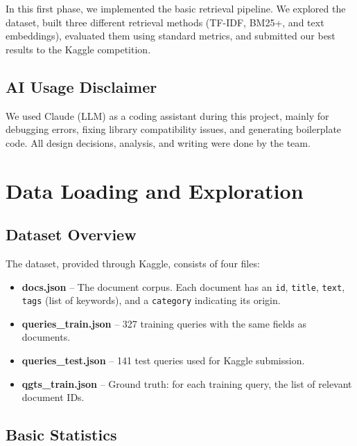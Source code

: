 \documentclass[12pt,a4paper]{article}
\begin{document}
In this first phase, we implemented the basic retrieval pipeline. We explored the dataset, built three different retrieval methods (TF-IDF, BM25+, and text embeddings), evaluated them using standard metrics, and submitted our best results to the Kaggle competition.

\subsection{AI Usage Disclaimer}

We used Claude (LLM) as a coding assistant during this project, mainly for debugging errors, fixing library compatibility issues, and generating boilerplate code. All design decisions, analysis, and writing were done by the team.

\section{Data Loading and Exploration}

\subsection{Dataset Overview}

The dataset, provided through Kaggle, consists of four files:

\begin{itemize}
    \item \textbf{docs.json} -- The document corpus. Each document has an \texttt{id}, \texttt{title}, \texttt{text}, \texttt{tags} (list of keywords), and a \texttt{category} indicating its origin.
    \item \textbf{queries\_train.json} -- 327 training queries with the same fields as documents.
    \item \textbf{queries\_test.json} -- 141 test queries used for Kaggle submission.
    \item \textbf{qgts\_train.json} -- Ground truth: for each training query, the list of relevant document IDs.
\end{itemize}

\subsection{Basic Statistics}
\end{document}
